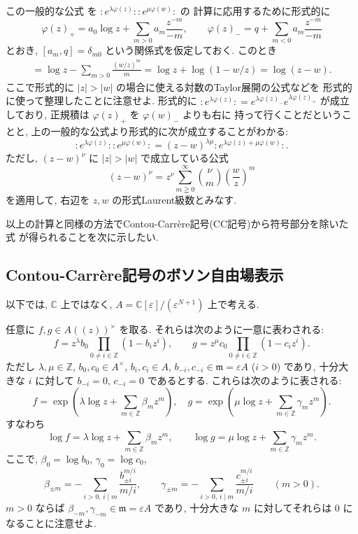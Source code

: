 \documentclass[12pt,twoside]{jarticle}
\newcommand\Z{{\mathbb Z}} %
\newcommand\C{{\mathbb C}} %
\theoremstyle{definition} %
\theoremstyle{definition} %
\theoremstyle{definition} %
\numberwithin{theorem}{section}
\numberwithin{equation}{section}
\numberwithin{figure}{section}
\numberwithin{table}{section}
\newcommand\eps{\varepsilon}
\newcommand\m{{\mathfrak m}}
\newcommand\np[1]{{:}{#1}{:}}
\begin{document}
この一般的な公式
を $\np{e^{\lambda\varphi(z)}}\np{e^{\mu\varphi(w)}}$ の
計算に応用するために形式的に
\[
\varphi(z)_+ = a_0\log z + \sum_{m>0} a_m \frac{z^{-m}}{-m}, \qquad
\varphi(z)_- = q         + \sum_{m<0} a_m \frac{z^{-m}}{-m}
\]
とおき, $[a_m,q]=\delta_{m0}$ という関係式を仮定しておく. このとき
\begin{align*}
[\varphi_+(z), \varphi_-(w)]
= \log z - \sum_{m>0}\frac{(w/z)^m}{m}
= \log z + \log(1-w/z)
= \log(z-w).
\end{align*}
ここで形式的に $|z|>|w|$ の場合に使える対数のTaylor展開の公式などを
形式的に使って整理したことに注意せよ.
形式的に $\np{e^{\lambda\varphi(z)}}=e^{\lambda\varphi(z)_-}e^{\lambda\varphi(z)_+}$
が成立しており, 正規積は $\varphi(z)_+$ を $\varphi(w)_-$ よりも右に
持って行くことだということと, 上の一般的な公式より形式的に次が成立することがわかる:
\[
\np{e^{\lambda\varphi(z)}}\np{e^{\mu\varphi(w)}}
=(z-w)^{\lambda\mu}\np{e^{\lambda\varphi(z)+\mu\varphi(w)}}.
\]
ただし, $(z-w)^\nu$ に $|z|>|w|$ で成立している公式
\[
(z-w)^\nu
= z^\nu\sum_{m\geqq 0}^\infty \binom{\nu}{m} \left(\frac{w}{z}\right)^m
\]
を適用して, 右辺を $z,w$ の形式Laurent級数とみなす.

以上の計算と同様の方法でContou-Carr\`ere記号(CC記号)から符号部分を除いた式
が得られることを次に示したい.


\subsection{Contou-Carr\`ere記号のボソン自由場表示}

以下では, $\C$ 上ではなく, $A=\C[\eps]/(\eps^{N+1})$ 上で考える.

任意に $f,g\in A((z))^\times$ を取る.
それらは次のように一意に表わされる:
\[
f = z^\lambda b_0\prod_{0\ne i\in\Z}(1-b_i z^i), \qquad
g = z^\mu     c_0\prod_{0\ne i\in\Z}(1-c_i z^i).
\]
ただし $\lambda,\mu\in\Z$, $b_0,c_0\in A^\times$,
$b_i,c_i\in A$, $b_{-i},c_{-i}\in\m=\eps A$ ($i>0$) であり,
十分大きな $i$ に対して $b_{-i}=0$, $c_{-i}=0$ であるとする.
これらは次のように表される:
\[
f = \exp\left(\lambda\log z+\sum_{m\in\Z} \beta_m  z^m \right), \quad
g = \exp\left(\mu\log z    +\sum_{m\in\Z} \gamma_m z^m \right).
\]
すなわち
\[
\log f = \lambda\log z+\sum_{m\in\Z} \beta_m  z^m, \qquad
\log g = \mu\log z    +\sum_{m\in\Z} \gamma_m z^m.
\]
ここで, $\beta_0=\log b_0$, $\gamma_0=\log c_0$,
\[
\beta_{\pm m}  = - \sum_{i>0,\, i\mid m}\frac{b_{\pm i}^{m/i}}{m/i}, \qquad
\gamma_{\pm m} = - \sum_{i>0,\, i\mid m}\frac{c_{\pm i}^{m/i}}{m/i}
\qquad (m>0).
\]
$m>0$ ならば $\beta_{-m},\gamma_{-m}\in\m=\eps A$ であり,
十分大きな $m$ に対してそれらは $0$ になることに注意せよ.
\end{document}
